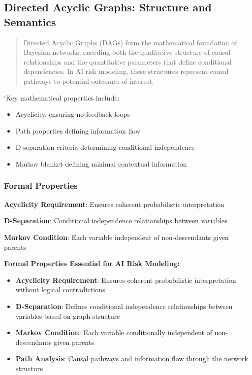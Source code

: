 \documentclass[
  11pt,
  letterpaper,
]{book}
\providecommand{\tightlist}{%
  \setlength{\itemsep}{0pt}\setlength{\parskip}{0pt}}
\begin{document}
\subsection{Directed Acyclic Graphs: Structure and
Semantics}\label{sec-dag-structure}

\begin{quote}
Directed Acyclic Graphs (DAGs) form the mathematical foundation of
Bayesian networks, encoding both the qualitative structure of causal
relationships and the quantitative parameters that define conditional
dependencies. In AI risk modeling, these structures represent causal
pathways to potential outcomes of interest.
\end{quote}

`Key mathematical properties include:

\begin{itemize}
\tightlist
\item
  Acyclicity, ensuring no feedback loops
\item
  Path properties defining information flow
\item
  D-separation criteria determining conditional independence
\item
  Markov blanket defining minimal contextual information
\end{itemize}

\subsubsection{Formal Properties}\label{sec-formal-properties}

\textbf{Acyclicity Requirement}: Ensures coherent probabilistic
interpretation

\textbf{D-Separation}: Conditional independence relationships between
variables

\textbf{Markov Condition}: Each variable independent of non-descendants
given parents

\textbf{Formal Properties Essential for AI Risk Modeling:}

\begin{itemize}
\tightlist
\item
  \textbf{Acyclicity Requirement}: Ensures coherent probabilistic
  interpretation without logical contradictions
\item
  \textbf{D-Separation}: Defines conditional independence relationships
  between variables based on graph structure
\item
  \textbf{Markov Condition}: Each variable conditionally independent of
  non-descendants given parents
\item
  \textbf{Path Analysis}: Causal pathways and information flow through
  the network structure
\end{itemize}
\end{document}
